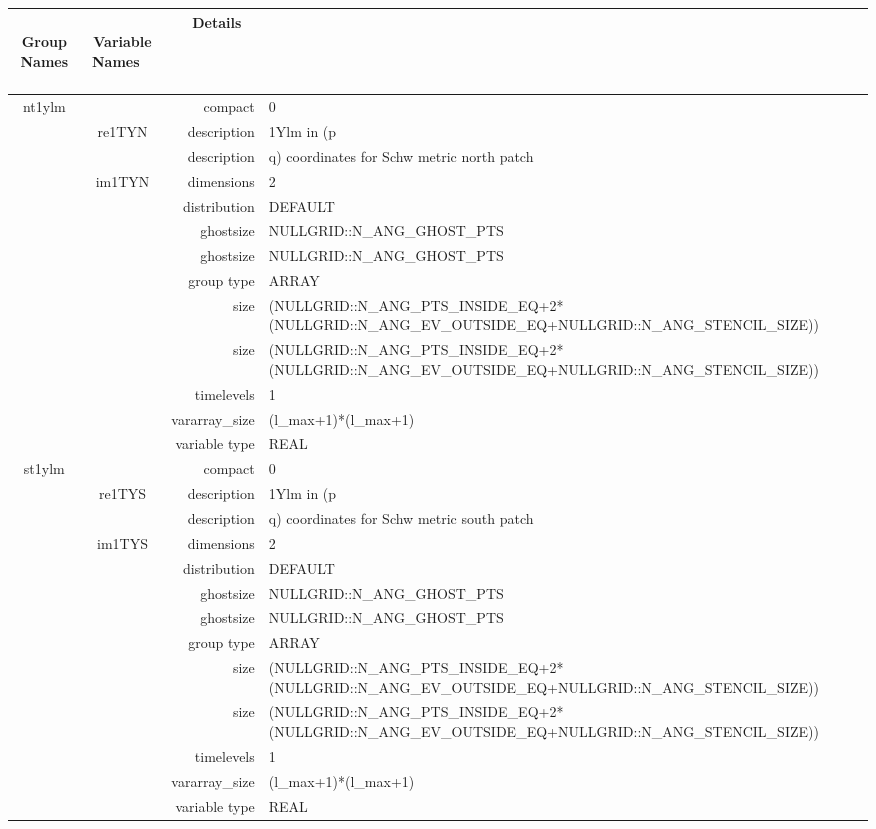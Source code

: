 \begin{tabular*}{150mm}{|c|c@{\extracolsep{\fill}}|rl|} \hline 
~ {\bf Group Names} ~ & ~ {\bf Variable Names} ~  &{\bf Details} ~ & ~ \\ 
\hline 
nt1ylm &  & compact & 0 \\ 
 & re1TYN & description & 1Ylm in (p \\ 
& ~ & description & q) coordinates for Schw metric north patch \\ 
 & im1TYN & dimensions & 2 \\ 
 &  & distribution & DEFAULT \\ 
 &  & ghostsize & NULLGRID::N\_ANG\_GHOST\_PTS \\ 
& ~ & ghostsize & NULLGRID::N\_ANG\_GHOST\_PTS \\ 
 &  & group type & ARRAY \\ 
 &  & size & (NULLGRID::N\_ANG\_PTS\_INSIDE\_EQ+2*(NULLGRID::N\_ANG\_EV\_OUTSIDE\_EQ+NULLGRID::N\_ANG\_STENCIL\_SIZE)) \\ 
& ~ & size & (NULLGRID::N\_ANG\_PTS\_INSIDE\_EQ+2*(NULLGRID::N\_ANG\_EV\_OUTSIDE\_EQ+NULLGRID::N\_ANG\_STENCIL\_SIZE)) \\ 
 &  & timelevels & 1 \\ 
 &  & vararray\_size & (l\_max+1)*(l\_max+1) \\ 
 &  & variable type & REAL \\ 
\hline 
st1ylm &  & compact & 0 \\ 
 & re1TYS & description & 1Ylm in (p \\ 
& ~ & description & q) coordinates for Schw metric south patch \\ 
 & im1TYS & dimensions & 2 \\ 
 &  & distribution & DEFAULT \\ 
 &  & ghostsize & NULLGRID::N\_ANG\_GHOST\_PTS \\ 
& ~ & ghostsize & NULLGRID::N\_ANG\_GHOST\_PTS \\ 
 &  & group type & ARRAY \\ 
 &  & size & (NULLGRID::N\_ANG\_PTS\_INSIDE\_EQ+2*(NULLGRID::N\_ANG\_EV\_OUTSIDE\_EQ+NULLGRID::N\_ANG\_STENCIL\_SIZE)) \\ 
& ~ & size & (NULLGRID::N\_ANG\_PTS\_INSIDE\_EQ+2*(NULLGRID::N\_ANG\_EV\_OUTSIDE\_EQ+NULLGRID::N\_ANG\_STENCIL\_SIZE)) \\ 
 &  & timelevels & 1 \\ 
 &  & vararray\_size & (l\_max+1)*(l\_max+1) \\ 
 &  & variable type & REAL \\ 

\end{tabular*}

